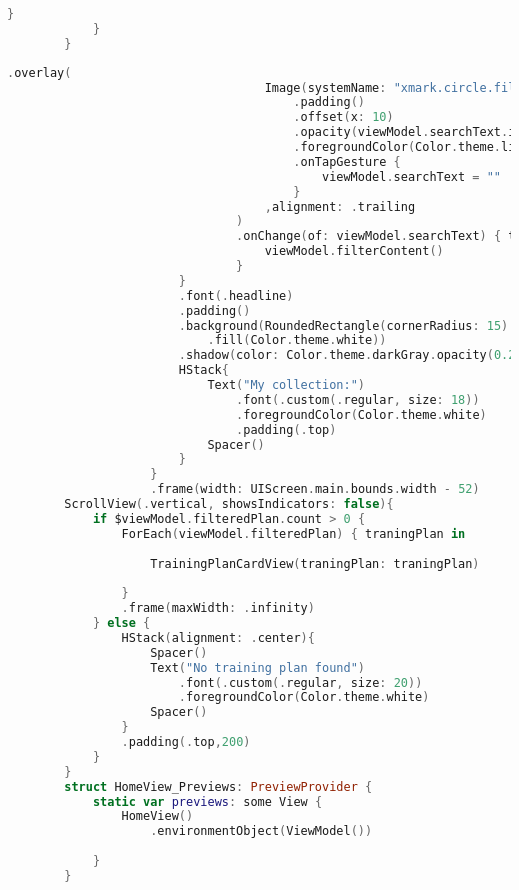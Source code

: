 \begin{minipage}{\textwidth}
\begin{lstlisting}[language=swift]
                }   
            }
        }  
    \end{lstlisting}   
\end{minipage}


\hspace{-10mm}
\begin{minipage}{\textwidth}
    \linespread{0.8}\selectfont
    \begin{lstlisting}[language=swift]
                            .overlay(
                                    Image(systemName: "xmark.circle.fill")
                                        .padding()
                                        .offset(x: 10)
                                        .opacity(viewModel.searchText.isEmpty ? 0.0 : 1.0)
                                        .foregroundColor(Color.theme.lighBlue)
                                        .onTapGesture {
                                            viewModel.searchText = ""
                                        }
                                    ,alignment: .trailing
                                )
                                .onChange(of: viewModel.searchText) { text in
                                    viewModel.filterContent()
                                }           
                        }
                        .font(.headline)
                        .padding()
                        .background(RoundedRectangle(cornerRadius: 15)
                            .fill(Color.theme.white))
                        .shadow(color: Color.theme.darkGray.opacity(0.25), radius: 5, x: 0, y: 4)  
                        HStack{
                            Text("My collection:")
                                .font(.custom(.regular, size: 18))
                                .foregroundColor(Color.theme.white)
                                .padding(.top)
                            Spacer()
                        }
                    }
                    .frame(width: UIScreen.main.bounds.width - 52)
        ScrollView(.vertical, showsIndicators: false){
            if $viewModel.filteredPlan.count > 0 {
                ForEach(viewModel.filteredPlan) { traningPlan in
                    
                    TrainingPlanCardView(traningPlan: traningPlan)
                    
                }
                .frame(maxWidth: .infinity)
            } else {
                HStack(alignment: .center){
                    Spacer()
                    Text("No training plan found")
                        .font(.custom(.regular, size: 20))
                        .foregroundColor(Color.theme.white)
                    Spacer()
                }
                .padding(.top,200)
            }
        }  
        struct HomeView_Previews: PreviewProvider {
            static var previews: some View {
                HomeView()
                    .environmentObject(ViewModel())
            
            }
        }
    \end{lstlisting}   
\end{minipage}


